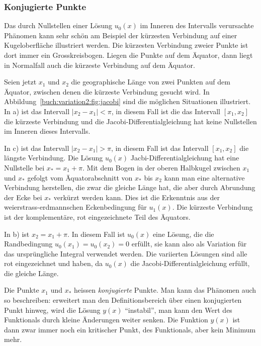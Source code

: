 %
%
\subsubsection{Konjugierte Punkte}

Das durch Nullstellen einer Lösung $u_0(x)$ im Inneren des Intervalls
verursachte Phänomen kann sehr schön am Beispiel der kürzesten
Verbindung auf einer Kugeloberfläche illustriert werden.
Die kürzesten Verbindung zweier Punkte ist dort immer ein Grosskreisbogen.
Liegen die Punkte auf dem Äquator, dann liegt in Normalfall auch die
kürzeste Verbindung auf dem Äquator.

Seien jetzt $x_1$ und $x_2$ die geographische Länge von zwei Punkten
auf dem Äquator, zwischen denen die kürzeste Verbindung gesucht wird.
In Abbildung~\ref{buch:variation2:fig:jacobi} sind die möglichen
Situationen illustriert.
In a) ist das Intervall $|x_2-x_1|<\pi$, in diesem Fall ist die
das Intervall $[x_1,x_2]$ die kürzeste Verbindung und die 
Jacobi-Differentialgleichung hat keine Nullstellen im Inneren 
dieses Intervalls.

In c) ist das Intervall $|x_2-x_1|>\pi$, in diesem Fall ist das Intervall
$[x_1,x_2]$ die längste Verbindung.
Die Lösung $u_0(x)$ Jacbi-Differentialgleichung hat eine Nullstelle
bei $x_*=x_1+\pi$.
Mit dem Bogen in der oberen Halbkugel zwischen $x_1$ und $x_*$
gefolgt vom Äquatorabschnitt von $x_*$ bis $x_2$ kann man eine
alternative Verbindung herstellen, die zwar die gleiche Länge hat,
die aber durch Abrundung der Ecke bei $x_*$ verkürzt werden kann.
Dies ist die Erkenntnis aus der weierstrass-erdmannschen
Eckenbedingung für $u_1(x)$.
Die kürzeste Verbindung ist der komplementäre, rot eingezeichnete
Teil des Äquators.

In b) ist $x_2=x_1+\pi$.
In diesem Fall ist $u_0(x)$ eine Lösung, die die Randbedingung
$u_0(x_1)=u_0(x_2)=0$ erfüllt, sie kann also als Variation
für das ursprüngliche Integral verwendet werden.
Die variierten Lösungen sind alle rot eingezeichnet und haben,
da $u_0(x)$ die Jacobi-Differentialgleichung erfüllt, die gleiche
Länge.

Die Punkte $x_1$ und $x_*$ heissen {\em konjugierte} Punkte.
%
Man kann das Phänomen auch so beschreiben: erweitert man den
Definitionsbereich über einen konjugierten Punkt hinweg, wird die
Lösung $y(x)$ ``instabil'', man kann den Wert des Funktionals
durch kleine Änderungen weiter senken.
Die Funktion $y(x)$ ist dann zwar immer noch ein kritischer Punkt,
des Funktionals, aber kein Minimum mehr.

